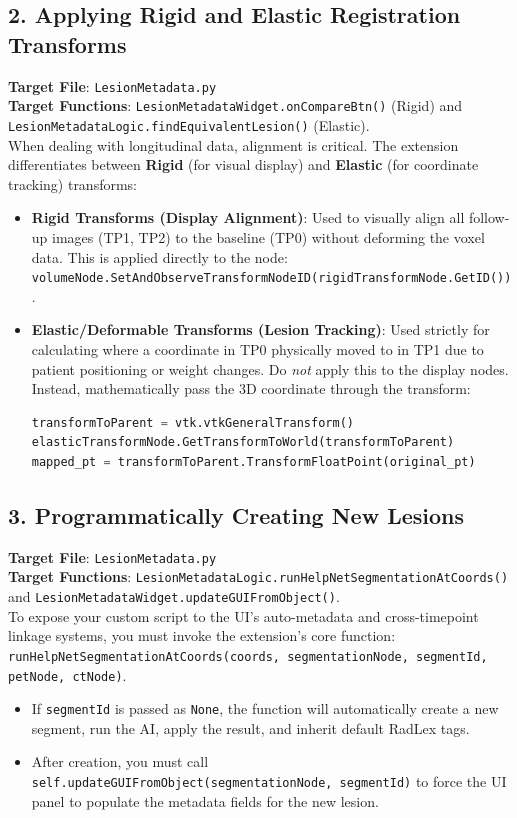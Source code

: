\documentclass[a4paper,10pt]{article}
\begin{document}
\subsection{2. Applying Rigid and Elastic Registration Transforms}
\textbf{Target File}: \texttt{LesionMetadata.py} \\
\textbf{Target Functions}: \texttt{LesionMetadataWidget.onCompareBtn()} (Rigid) and \texttt{LesionMetadataLogic.findEquivalentLesion()} (Elastic). \\
When dealing with longitudinal data, alignment is critical. The extension differentiates between \textbf{Rigid} (for visual display) and \textbf{Elastic} (for coordinate tracking) transforms:
\begin{itemize}
    \item \textbf{Rigid Transforms (Display Alignment)}: Used to visually align all follow-up images (TP1, TP2) to the baseline (TP0) without deforming the voxel data. This is applied directly to the node: \texttt{volumeNode.SetAndObserveTransformNodeID(rigidTransformNode.GetID())}.
    \item \textbf{Elastic/Deformable Transforms (Lesion Tracking)}: Used strictly for calculating where a coordinate in TP0 physically moved to in TP1 due to patient positioning or weight changes. Do \textit{not} apply this to the display nodes. Instead, mathematically pass the 3D coordinate through the transform:
    \begin{lstlisting}[language=Python]
transformToParent = vtk.vtkGeneralTransform()
elasticTransformNode.GetTransformToWorld(transformToParent)
mapped_pt = transformToParent.TransformFloatPoint(original_pt)
    \end{lstlisting}
\end{itemize}

\subsection{3. Programmatically Creating New Lesions}
\textbf{Target File}: \texttt{LesionMetadata.py} \\
\textbf{Target Functions}: \texttt{LesionMetadataLogic.runHelpNetSegmentationAtCoords()} and \texttt{LesionMetadataWidget.updateGUIFromObject()}. \\
To expose your custom script to the UI's auto-metadata and cross-timepoint linkage systems, you must invoke the extension's core function: \texttt{runHelpNetSegmentationAtCoords(coords, segmentationNode, segmentId, petNode, ctNode)}.
\begin{itemize}
    \item If \texttt{segmentId} is passed as \texttt{None}, the function will automatically create a new segment, run the AI, apply the result, and inherit default RadLex tags.
    \item After creation, you must call \texttt{self.updateGUIFromObject(segmentationNode, segmentId)} to force the UI panel to populate the metadata fields for the new lesion.
\end{itemize}
\end{document}
